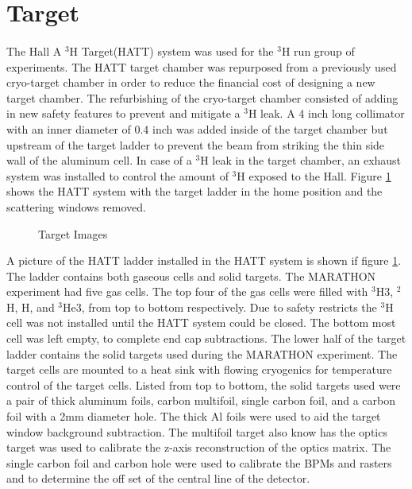 \section{Target}\label{sec:target}
\paragraph{} The Hall A $^3$H Target(HATT) system was used for the $^3$H run group of experiments. The HATT target chamber was repurposed from a previously used cryo-target chamber in order to reduce the financial cost of designing a new target chamber. The refurbishing of the cryo-target chamber consisted of adding in new safety features to prevent and mitigate a $^3$H leak.  A 4 inch long collimator with an inner diameter of 0.4 inch was added inside of the target chamber but upstream of the target ladder to prevent the beam from striking the thin side wall of the aluminum cell. In case of a $^3$H leak in the target chamber, an exhaust system was installed to control the amount of $^3$H exposed to the Hall.\cite{HATT_eng}  Figure \ref{HATT} shows the HATT system with the target ladder in the home position and the scattering windows removed. 
\begin{figure}[t]
	\centering
	\caption{Target Images}
	\hspace*{-20pt}
	\centering
	\label{HATT}


\end{figure}
A picture of the HATT ladder installed in the HATT system is shown if figure \ref{HATT}. The ladder contains both gaseous cells and solid targets. The MARATHON experiment had five gas cells. The top four of the gas cells were filled with $^3$H3, $^2$H, H, and $^3$He3, from top to bottom respectively. Due to safety restricts the $^3$H cell was not installed until the HATT system could be closed. The bottom most cell was left empty, to complete end cap subtractions. The lower half of the target ladder contains the solid targets used during the MARATHON experiment. The target cells are mounted to a heat sink with flowing cryogenics for temperature control of the target cells. Listed from top to bottom, the solid targets used were a pair of thick aluminum foils, carbon multifoil, single carbon foil, and a carbon foil with a 2mm diameter hole. The thick Al foils were used to aid the target window background subtraction. The multifoil target also know has the optics target was used to calibrate the z-axis  reconstruction of the optics matrix. The single carbon foil and carbon hole were used to calibrate the BPMs and rasters and to determine the off set of the central line of the detector. 


